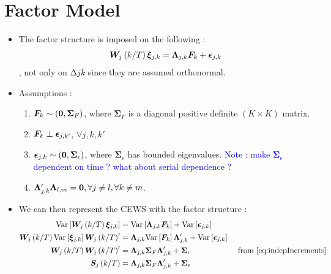\documentclass[main_document.tex]{subfiles}
\begin{document}
\section{Factor Model}
	\begin{itemize}
		\item The factor structure is imposed on the following : 
			\begin{align} \label{eq:factorStructure}
				\bm{W}_{j}\left(k/T\right) \bm{\xi}_{j,k} = \bm{\Lambda}_{j,k} \bm{F}_{k} + \bm{\epsilon}_{j,k}
			\end{align}
			, not only on $\increment{j}{k}$ since they are assumed orthonormal.
		\item Assumptions : 	
			\begin{enumerate}
				\item $\bm{F}_{k} \sim (\bm{0}, \bm{\Sigma}_F)$, where $\bm{\Sigma}_F$ is a diagonal positive definite $(K \times K)$ matrix. 
				\item $\bm{F}_{k} \perp \bm{\epsilon}_{j,k'}$, $\forall j,k,k'$
				\item $\bm{\epsilon}_{j,k} \sim (\bm{0}, \bm{\Sigma}_{\epsilon})$, where $\bm{\Sigma}_{\epsilon}$ has bounded eigenvalues. \textcolor{blue}{Note : make $\bm{\Sigma}_{\epsilon}$ dependent on time ? what about serial dependence ?}
				\item  $\bm{\Lambda}_{j,k}'\bm{\Lambda}_{l,m} = \bm{0}, \forall j \neq l, \forall k \neq m$. 
			\end{enumerate}
		\item We can then represent the CEWS with the factor structure : 
		\begin{align*}
			\mathrm{Var}\left[\bm{W}_{j}\left(k/T\right)\bm{\xi}_{j,k}\right]        	    &= \mathrm{Var}\left[\bm{\Lambda}_{j,k}\bm{F}_{k}\right] + \mathrm{Var}\left[\bm{\epsilon}_{j,k}\right] \\
			\bm{W}_{j}\left(k/T\right) \mathrm{Var}\left[\bm{\xi}_{j,k}\right] \bm{W}_{j}\left(k/T\right)' &= \bm{\Lambda}_{j,k}\mathrm{Var}\left[\bm{F}_{k}\right]\bm{\Lambda}_{j,k}' +  \mathrm{Var}\left[\bm{\epsilon}_{j,k}\right]\\
			\bm{W}_{j}\left(k/T\right)\bm{W}_{j}\left(k/T\right)' &=  \bm{\Lambda}_{j,k}\bm{\Sigma}_{F}\bm{\Lambda}_{j,k}' +  \bm{\Sigma}_{\epsilon} &\text{ from } \eqref{eq:indepIncrements}\\
			\bm{S}_{j}\left(k/T\right) &= \bm{\Lambda}_{j,k}\bm{\Sigma}_{F}\bm{\Lambda}_{j,k}' +  \bm{\Sigma}_{\epsilon}
		\end{align*}
	\end{itemize}
\end{document}
